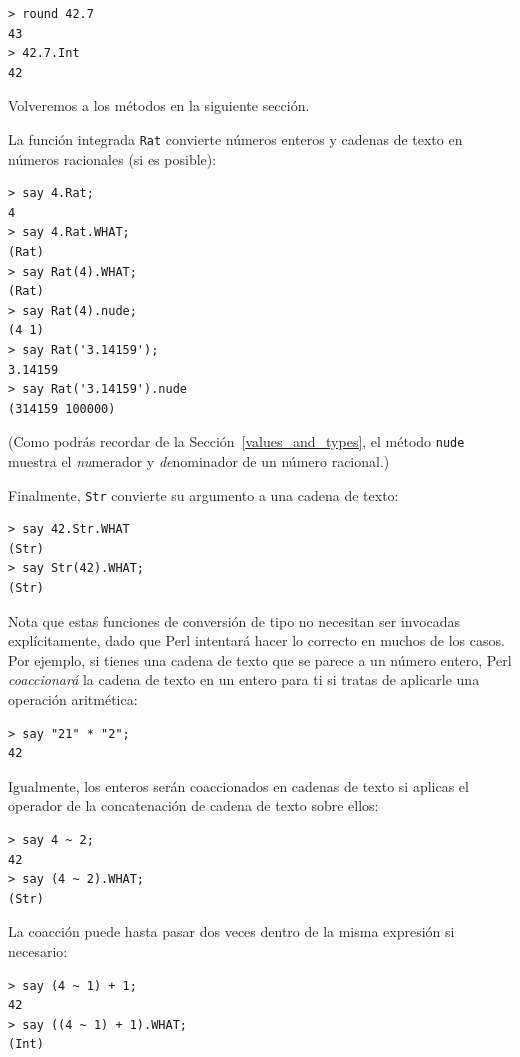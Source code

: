 \begin{lstlisting}
> round 42.7
43
> 42.7.Int
42
\end{lstlisting}

Volveremos a los métodos en la siguiente sección.

La función integrada {\tt Rat} convierte números
enteros y cadenas de texto en números racionales (si es posible):

\begin{lstlisting}
> say 4.Rat;
4
> say 4.Rat.WHAT;
(Rat)
> say Rat(4).WHAT;
(Rat)
> say Rat(4).nude;
(4 1)
> say Rat('3.14159');
3.14159
> say Rat('3.14159').nude
(314159 100000)
\end{lstlisting}
%
(Como podrás recordar de la Sección~\ref{values_and_types}, 
el método \verb'nude' muestra el \emph{nu}merador y  
\emph{de}nominador de un número racional.)

Finalmente, {\tt Str} convierte su argumento a una cadena de texto:

\begin{lstlisting}
> say 42.Str.WHAT
(Str)
> say Str(42).WHAT;
(Str)
\end{lstlisting}

Nota que estas funciones de conversión de tipo no necesitan ser
invocadas explícitamente, dado que Perl intentará hacer lo correcto
en muchos de los casos. Por ejemplo, si tienes una cadena de texto
que se parece a un número entero, Perl \emph{coaccionará} la cadena 
de texto en un entero para ti si tratas de aplicarle una operación 
aritmética:

\begin{lstlisting}
> say "21" * "2";
42
\end{lstlisting}

Igualmente, los enteros serán coaccionados en cadenas de texto
si aplicas el operador de la concatenación de cadena de texto
sobre ellos:

\begin{lstlisting}
> say 4 ~ 2;
42
> say (4 ~ 2).WHAT;
(Str)
\end{lstlisting}

La coacción puede hasta pasar dos veces dentro de la misma expresión
si necesario:

\begin{lstlisting}
> say (4 ~ 1) + 1;
42
> say ((4 ~ 1) + 1).WHAT;
(Int)
\end{lstlisting}

